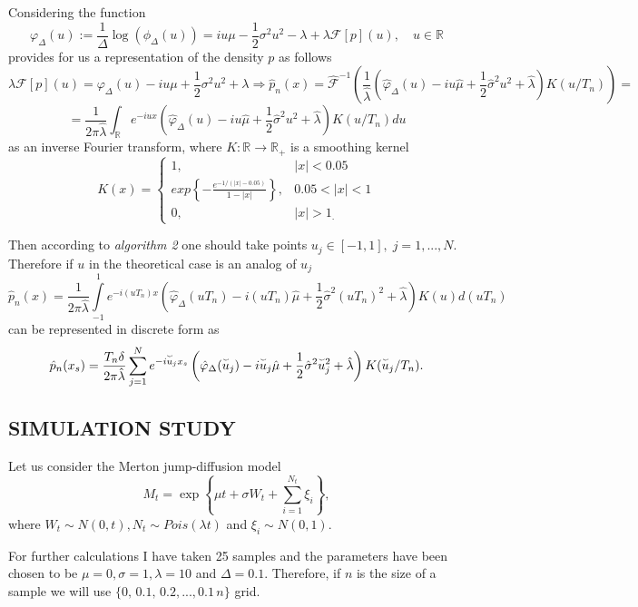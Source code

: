Considering the function \[ \varphi_{\Delta}(u) := \frac{1}{\Delta} \log(\phi_{\Delta}(u)) = i u \mu - \frac{1}{2} \sigma^2 u^2 - \lambda + \lambda \mathcal{F}[p](u), \quad u \in \mathbb{R} \] provides for us a representation of the density $p$ as follows \[ \lambda \mathcal{F}[p](u) = \varphi_{\Delta}(u) - i u \mu + \frac{1}{2} \sigma^2 u^2 + \lambda \Rightarrow \hat{p}_n (x) = \hat{\mathcal{F}}^{-1} \left( \frac{1}{\hat{\lambda}} (\hat{\varphi}_{\Delta}(u) - i u \hat{\mu} + \frac{1}{2} \hat{\sigma}^2 u^2 + \hat{\lambda}) K(u / T_n) \right) = \]
\[ = \frac{1}{2 \pi \hat{\lambda}} \int_{\mathbb{R}} e^{-i u x} \left( \hat{\varphi}_{\Delta}(u) - i u \hat{\mu} + \frac{1}{2} \hat{\sigma}^2 u^2 + \hat{\lambda} \right) K(u / T_n) du \] as an inverse Fourier transform, where $K: \mathbb{R} \rightarrow \mathbb{R}_+$ is a smoothing kernel \[ K(x) = \begin{cases}
    1, & |x| < 0.05 \\
    exp \left\{ -\frac{e^{-1 / (|x| - 0.05)}} {1 - |x|} \right\} , & 0.05 < |x| < 1 \\
    0, & |x| > 1_.
\end{cases} \]

Then according to \textit{algorithm 2} one should take points $u_j \in [-1, 1], \; j = 1, ..., N.$ Therefore if $u$ in the theoretical case is an analog of $u_j$ \[ \hat{p}_n (x) = \frac{1}{2 \pi \hat{\lambda}} \int\limits_{-1}^{1} e^{-i (u T_n) x} \left( \hat{\varphi}_{\Delta}(u T_n) - i (u T_n) \hat{\mu} + \frac{1}{2} \hat{\sigma}^2 (u T_n)^2 + \hat{\lambda} \right) K(u) d(u T_n) \] can be represented in discrete form as \[ \hat{p}_n (x_s) = \frac{T_n \delta}{2 \pi \hat{\lambda}} \sum\limits_{j=1}^{N} e^{-i \accentset{\smallsmile}{u}_j x_s} \left( \hat{\varphi}_{\Delta}(\accentset{\smallsmile}{u}_j) - i \accentset{\smallsmile}{u}_j \hat{\mu} + \frac{1}{2} \hat{\sigma}^2 \accentset{\smallsmile}{u}_{j}^2 + \hat{\lambda} \right) K(\accentset{\smallsmile}{u}_j / T_n). \]


\subsection{SIMULATION  STUDY}

Let us consider the Merton jump-diffusion model \[ M_t = \exp \left\{\mu t + \sigma W_t + \sum\limits_{i=1}^{N_t} \xi_i \right\}, \] where $W_t \sim N(0, t), N_t \sim Pois(\lambda t)$ and $\xi_i \sim N(0, 1)$.

For further calculations I have taken 25 samples and the parameters have been chosen to be $\mu = 0, \sigma = 1, \lambda = 10$ and $\Delta = 0.1$. Therefore, if $n$ is the size of a sample we will use $\{0, \, 0.1, \, 0.2, ..., 0.1 \, n\}$ grid.


